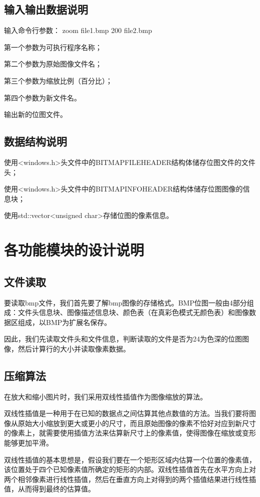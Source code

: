 \documentclass{ctexart}
\begin{document}
    \subsection{输入输出数据说明}
    输入命令行参数：
    zoom file1.bmp 200 file2.bmp
    
    第一个参数为可执行程序名称；
    
    第二个参数为原始图像文件名；
    
    第三个参数为缩放比例（百分比）；
    
    第四个参数为新文件名。
    
    输出新的位图文件。
    
    \subsection{数据结构说明}
    使用<windows.h>头文件中的BITMAPFILEHEADER结构体储存位图文件的文件头；
    
    使用<windows.h>头文件中的BITMAPINFOHEADER结构体储存位图图像的信息块；
    
    使用std::vector<unsigned char>存储位图的像素信息。
    
    
    \section{各功能模块的设计说明}
    \subsection{文件读取}
    要读取bmp文件，我们首先要了解bmp图像的存储格式。BMP位图一般由4部分组成：文件头信息块、图像描述信息块、颜色表（在真彩色模式无颜色表）和图像数据区组成，以BMP为扩展名保存。
    
    因此，我们先读取文件头和文件信息，判断读取的文件是否为24为色深的位图图像，然后计算行的大小并读取像素数据。
    \subsection{压缩算法}
    
    在放大和缩小图片时，我们采用双线性插值作为图像缩放的算法。
    
    双线性插值是一种用于在已知的数据点之间估算其他点数值的方法。当我们要将图像从原始大小缩放到更大或更小的尺寸，而且原始图像的像素不恰好对应到新尺寸的像素上，就需要使用插值方法来估算新尺寸上的像素值，使得图像在缩放或变形能够更加平滑。 
    
    双线性插值的基本思想是，假设我们要在一个矩形区域内估算一个位置的像素值，该位置处于四个已知像素值所确定的矩形的内部。双线性插值首先在水平方向上对两个相邻像素进行线性插值，然后在垂直方向上对得到的两个插值结果进行线性插值，从而得到最终的估算值。
    
\end{document}
